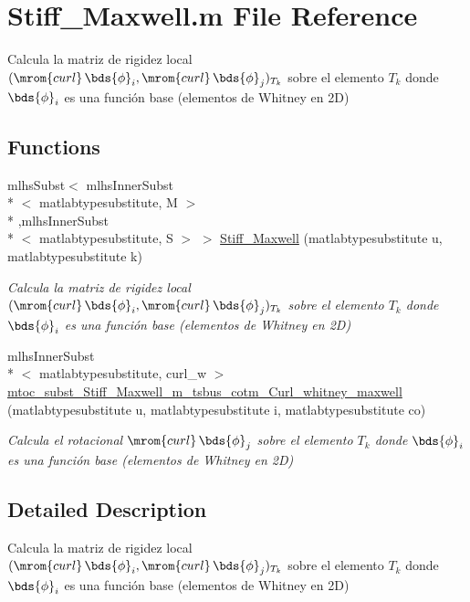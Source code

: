\hypertarget{a00032}{\section{Stiff\-\_\-\-Maxwell.\-m File Reference}
\label{a00032}
}


Calcula la matriz de rigidez local $ ( \mrom{curl}\,\bds{\phi}_i,\mrom{curl}\,\bds{\phi}_j)_{T_k}$ sobre el elemento $ T_k $ donde $ \bds{\phi}_i $ es una función base (elementos de Whitney en 2\-D)  


\subsection*{Functions}
\begin{DoxyCompactItemize}
\item 
mlhs\-Subst$<$ mlhs\-Inner\-Subst\\*
$<$ matlabtypesubstitute, M $>$\\*
,mlhs\-Inner\-Subst\\*
$<$ matlabtypesubstitute, S $>$ $>$ \hyperlink{a00032_ae71a076bdebe889a60280f03734e4df0}{Stiff\-\_\-\-Maxwell} (matlabtypesubstitute u, matlabtypesubstitute k)
\begin{DoxyCompactList}\small\item\em Calcula la matriz de rigidez local $ ( \mrom{curl}\,\bds{\phi}_i,\mrom{curl}\,\bds{\phi}_j)_{T_k}$ sobre el elemento $ T_k $ donde $ \bds{\phi}_i $ es una función base (elementos de Whitney en 2\-D) \end{DoxyCompactList}\item 
mlhs\-Inner\-Subst\\*
$<$ matlabtypesubstitute, curl\-\_\-w $>$ \hyperlink{a00032_a8c5a4658d693facc7df0f7de9761b1ee}{mtoc\-\_\-subst\-\_\-\-Stiff\-\_\-\-Maxwell\-\_\-m\-\_\-tsbus\-\_\-cotm\-\_\-\-Curl\-\_\-whitney\-\_\-maxwell} (matlabtypesubstitute u, matlabtypesubstitute i, matlabtypesubstitute co)
\begin{DoxyCompactList}\small\item\em Calcula el rotacional $ \mrom{curl}\,\bds{\phi}_j$ sobre el elemento $ T_k $ donde $ \bds{\phi}_i $ es una función base (elementos de Whitney en 2\-D) \end{DoxyCompactList}\end{DoxyCompactItemize}


\subsection{Detailed Description}
Calcula la matriz de rigidez local $ ( \mrom{curl}\,\bds{\phi}_i,\mrom{curl}\,\bds{\phi}_j)_{T_k}$ sobre el elemento $ T_k $ donde $ \bds{\phi}_i $ es una función base (elementos de Whitney en 2\-D) 

